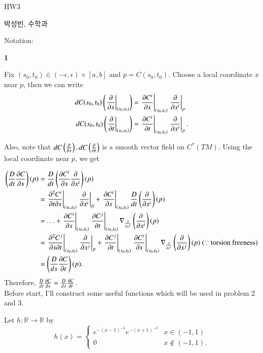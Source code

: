 \documentclass[a4paper, 12pt]{article}
\theoremstyle{Mydefinition}
\theoremstyle{Mytheorem}
\begin{document}
\thispagestyle{myfirstpage}
\begin{center}
    \Large{HW3}
\end{center}
박성빈, 수학과

Notation: 

\noindent \textbf{1}

Fix $(s_0, t_0)\in (-\epsilon, \epsilon)\times [a,b]$ and $p=C(s_0, t_0)$. Choose a local coordinate $x$ near $p$, then we can write
\begin{equation}
\begin{split}
    dC(s_0, t_0)\left(\left.\pdv{s}\right|_{(s_0,t_0)}\right) &= \left.\pdv{C^i}{s}\right|_{(s_0,t_0)}\left.\pdv{x^i}\right|_{p}\\
    dC(s_0, t_0)\left(\left.\pdv{t}\right|_{(s_0,t_0)}\right) &= \left.\pdv{C^i}{t}\right|_{(s_0,t_0)}\left.\pdv{x^i}\right|_{p}.
\end{split}
\end{equation}

Also, note that $dC\left(\pdv{s}\right), dC\left(\pdv{t}\right)$ is a smooth vector field on $C^*(TM)$. Using the local coordinate near $p$, we get

\begin{equation}
\begin{split}
    \left(\frac{D}{dt}\pdv{C}{s}\right)(p) &= \frac{D}{dt}\left(\pdv{C^i}{s}\pdv{x^i}\right)(p)\\
    &=\left.\pdv{C^i}{t}{s}\right|_{(s_0, t_0)}\left.\pdv{x^i}\right|_p + \left.\pdv{C^i}{s}\right|_{(s_0, t_0)}\frac{D}{dt}\left(\pdv{x^i}\right)(p)\\
    &=\ldots + \left.\pdv{C^i}{s}\right|_{(s_0, t_0)}\left.\pdv{C^j}{t}\right|_{(s_0, t_0)}\nabla_{\pdv{x^j}}\left(\pdv{x^i}\right)(p)\\
    &=\left.\pdv{C^j}{s}{t}\right|_{(s_0, t_0)}\left.\pdv{x^j}\right|_p + \left.\pdv{C^j}{t}\right|_{(s_0, t_0)}\left.\pdv{C^i}{s}\right|_{(s_0, t_0)}\nabla_{\pdv{x^i}}\left(\pdv{x^j}\right)(p)~(\because \textrm{torsion freeness)}\\
    &=\left(\frac{D}{ds}\pdv{C}{t}\right)(p).
\end{split}
\end{equation}
Therefore, $\frac{D}{dt}\pdv{C}{s} = \frac{D}{ds}\pdv{C}{t}$.\\

Before start, I'll construct some useful functions which will be used in problem 2 and 3.

Let $h:\mathbb{R}\rightarrow\mathbb{R}$ by
\begin{equation}
    h(x)=\begin{cases}
    e^{-(x-1)^{-2}}e^{-(x+1)^{-2}} & x\in (-1, 1)\\
    0 & x\notin (-1, 1).
    \end{cases}
\end{equation}
\end{document}
